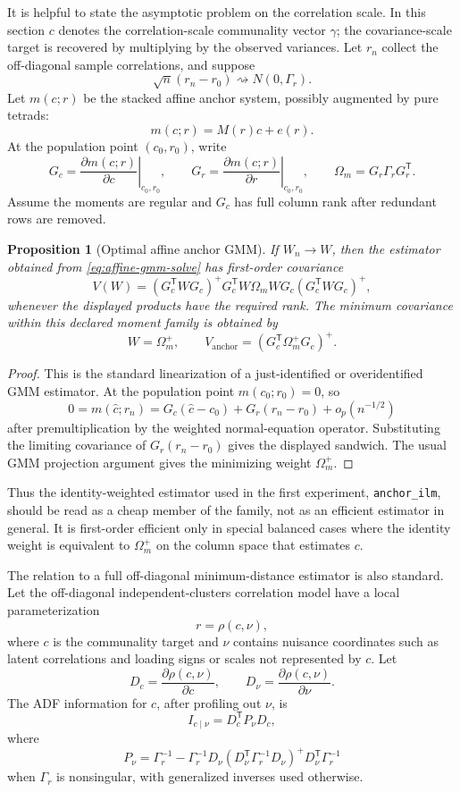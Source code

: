 \documentclass[11pt]{article}
\newcommand{\T}{^{\mathsf T}}
\theoremstyle{plain}
\newtheorem{proposition}{Proposition}
\theoremstyle{remark}
\begin{document}
It is helpful to state the asymptotic problem on the correlation scale. In this
section \(c\) denotes the correlation-scale communality vector \(\gamma\); the
covariance-scale target is recovered by multiplying by the observed variances.
Let \(r_n\) collect the off-diagonal sample correlations, and suppose
\[
  \sqrt n(r_n-r_0)\rightsquigarrow N(0,\Gamma_r).
\]
Let \(m(c;r)\) be the stacked affine anchor system, possibly augmented by pure
tetrads:
\[
  m(c;r)=M(r)c+e(r).
\]
At the population point \((c_0,r_0)\), write
\[
  G_c=\left.\frac{\partial m(c;r)}{\partial c}\right|_{c_0,r_0},
  \qquad
  G_r=\left.\frac{\partial m(c;r)}{\partial r}\right|_{c_0,r_0},
  \qquad
  \Omega_m=G_r\Gamma_rG_r\T .
\]
Assume the moments are regular and \(G_c\) has full column rank after redundant
rows are removed.

\begin{proposition}[Optimal affine anchor GMM]
\label{prop:optimal-anchor-gmm}
If \(W_n\to W\), then the estimator obtained from
\eqref{eq:affine-gmm-solve} has first-order covariance
\[
  V(W)
  =
  (G_c\T W G_c)^{+}
  G_c\T W\Omega_m W G_c
  (G_c\T W G_c)^{+},
\]
whenever the displayed products have the required rank. The minimum covariance
within this declared moment family is obtained by
\[
  W=\Omega_m^{+},
  \qquad
  V_{\mathrm{anchor}}
  =
  (G_c\T\Omega_m^{+}G_c)^{+}.
\]
\end{proposition}

\begin{proof}
This is the standard linearization of a just-identified or overidentified GMM
estimator. At the population point \(m(c_0;r_0)=0\), so
\[
  0
  =
  m(\hat c;r_n)
  =
  G_c(\hat c-c_0)+G_r(r_n-r_0)+o_p(n^{-1/2})
\]
after premultiplication by the weighted normal-equation operator. Substituting
the limiting covariance of \(G_r(r_n-r_0)\) gives the displayed sandwich. The
usual GMM projection argument gives the minimizing weight
\(\Omega_m^{+}\).
\end{proof}

Thus the identity-weighted estimator used in the first experiment,
\texttt{anchor\_ilm}, should be read as a cheap member of the family, not as an
efficient estimator in general. It is first-order efficient only in special
balanced cases where the identity weight is equivalent to \(\Omega_m^{+}\) on
the column space that estimates \(c\).

The relation to a full off-diagonal minimum-distance estimator is also
standard. Let the off-diagonal independent-clusters correlation model have a
local parameterization
\[
  r=\rho(c,\nu),
\]
where \(c\) is the communality target and \(\nu\) contains nuisance coordinates
such as latent correlations and loading signs or scales not represented by
\(c\). Let
\[
  D_c=\frac{\partial \rho(c,\nu)}{\partial c},
  \qquad
  D_\nu=\frac{\partial \rho(c,\nu)}{\partial \nu}.
\]
The ADF information for \(c\), after profiling out \(\nu\), is
\[
  I_{c\mid\nu}
  =
  D_c\T P_\nu D_c,
\]
where
\[
  P_\nu
  =
  \Gamma_r^{-1}
  -
  \Gamma_r^{-1}D_\nu
  (D_\nu\T\Gamma_r^{-1}D_\nu)^{+}
  D_\nu\T\Gamma_r^{-1}
\]
when \(\Gamma_r\) is nonsingular, with generalized inverses used otherwise.
\end{document}
